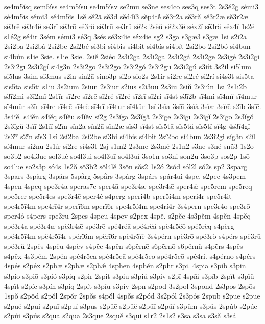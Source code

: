 {sē4m5ísq
sēm5íss
sē4m5ísu
sē4m5ísv
sē2mū
sē3ne
sēs4cō
sēs3q
sēs3t
2s3ḗ2g
sḗmi3
sḗ4m5is
sḗmĭ3
sḗ4m5ĭs
1sĕ
sĕ2ă
sĕ3d
sĕd4ĭ3
sĕp4tĕ́
sĕ3r2a
sĕ3ră
sĕ3r2æ
sĕ3r2ǣ
sĕ3rē
sĕ3r4ĕ
sĕ3rī
sĕ3rō
sĕ3rŏ
sĕ3rū
sĕ3rŭ
sĕ2s
2sĕŭ
sĕ2x3ĕ
sĕx2ĭ
sĕ́3ră
sĕ́x4ĭ
1s2é
s1é2g
sé4ir
3sém
sémi3
sé3q
3sés
sé3x4ie
séx4iē
sg2
s3ga
s3gæ3
s3gǣ
1si
s2i2a
2si2ba
2si2bá
2si2be
2si2bé
si3bi
si4bis
si4bit
si4bís
si4bít
2si2bo
2si2bó
si4bun
si4bún
s1ie
3sie.
s1iē
3siē.
2siĕ
2siéc
2s3i2ga
2s3i2gā
2s3i2gá
2s3i2gē
2s3igé
2s3i2gi
2s3i2gī
2s3i2gí
si4g3n
2s3i2go
2s3i2gō
2s3i2gó
2s3i2gu
2s3i2gú
s3iít
3s2il
si5lum
si5lus
3sim
si3mus
s2in
sin2ā
sino3p
si2o
sio2s
2s1ir
si2re
si2ré
si2rí
si4s3t
sis5ta
sis5tā
sis5ti
s1iu
3s2ium
2siun
2s3iur
s2ius
s2i3uu
2s3iū
2siŭ
2s3iún
1sī
2s1ī2b
s3ī2mi
s3ī2mĭ
2s1īr
sī2re
sī2rē
sī2rĕ
sī2ré
sī2rī
sī2rí
sī4st
s3ī́2b
sī́4mi
sī́4mĭ
sī́4mur
sī́4mŭr
s3ī́r
sī́4re
sī́4rē
sī́4rĕ
sī́4rī
sī́4tur
sī́4tŭr
1sĭ
3sĭa
3sĭā
3sĭă
3sĭæ
3sĭǣ
s2ĭb
3sĭē.
3s4ĭĕ.
s4ĭĕn
s4ĭĕq
s4ĭĕu
s4ĭĕv
sĭ2g
2s3ĭgā
2s3ĭgă
2s3ĭgē
2s3ĭgī
2s3ĭgĭ
2s3ĭgō
2s3ĭgŏ
2s3ĭgŭ
3sĭī
2s1ĭĭ
s2ĭn
sĭn2a
sĭn2ā
sĭn2æ
sĭs3
sĭ4st
sĭs5tā
sĭs5tă
sĭs5tĭ
sĭ4́g
4s3ĭ́4gĭ
2s3ĭ́ĭ
s2ĭ́n
sĭ́s3
1sí
2sí2ba
2sí2be
sí3bi
sí4bis
sí4bit
2sí2bo
sí4bun
2s3í2gi
síg3n
s2íl
sí4mur
sí2nu
2s1ír
sí2re
sí4s3t
2sj
s1m2
2s3me
2s3mé
2s1n2
s3ne
s3nĕ
snŭ́3
1s2o
so3b2
so4l3ue
sol3ué
so4l3ui
so4l3uī
so4l3uí
3so1n
so3ni
son2u
3so3p
sos2p
1sō
sō4lue
sō2s3p
sṓ4s
1s2ŏ
sŏ3b2
sŏl4lĕ
3sŏn
sŏs2
1s2ó
2sód
sól2l
só2s
sp2
3sparg
3spars
3spărg
3spărs
5spắrg
5spắrs
3spárg
3spárs
spár4ui
4spe.
s2pec
4s3pem
4spen
4speq
spe3r4a
speras7c
sper4ā
spe3r4æ
spe3r4ǣ
sper4ǽ
spe5rem
spe5req
spe5rer
spe5r4es
spe3r4ē
sper4é
s4perg
speri4b
sper5i4m
speri4r
spe5r4it
spe4r5ī4m
spe4rī4r
sperī́6m
sperī́6r
spe4r5í4m
spe4rí4r
3s4pern
spe3r4o
spe3rō
sper4ó
s4pers
spe3rū
2spes
4speu
4spev
s2pex
4spĕ.
s2pĕc
4s3pĕm
4spĕn
4spĕq
spĕ3r4a
spĕ3r4æ
spĕ3r4ǣ
spĕ3rē
spĕ4rĕā
spĕ4rĕă
spĕ4r5ĕō
spĕ5rĕq
s4pĕrg
spĕ4r5ī4m
spĕ4r5ī4r
spĕrī́6m
spĕrī́6r
spĕ4r5ĭĕ
3s4pĕrn
spĕ3rō
spĕ3rŏ
s4pĕrs
spĕ3rū
spĕ3rŭ
2spĕs
4spĕu
4spĕv
s4pĕ́c
4spĕ́n
s6pĕ́rnē
s6pĕ́rnō
s6pĕ́rnŭ
s4pĕ́rs
4spĕ́s
s4pĕ́x
4s3pém
2spén
spé4r5ea
spé4r5eā
spé4r5eo
spé4r5eō
spé4ri.
s4pérno
s4pérs
4spés
s2péx
s2phæ
s2phǣ
s2phǽ
4sphen
4sphén
s2phr
s3pi.
4spia
s3pib
s3pin
s3pio
s3piō
s3pió
s3piq
s2pir
2spit
s3piu
s3piú
s3piv
s2pī
4spĭă
s3pĭb
2spĭt
s3pĭŭ
4spĭ́t
s2píc
s3pín
s3píq
2spít
s3píu
s3pív
2spn
s2pod
3s2pol
3spond
2s3pos
2spōs
1spŏ
s2pŏd
s2pŏl
2spŏr
2spŏs
s4pŏ́l
4spŏ́s
s2pód
3s2pól
2s3pós
2spub
s2pue
s2puē
s2pué
s2pui
s2puī
s2puí
s3pus
s2pŭē
s2pŭĕ
s2pŭī
s2pŭĭ
s3pŭm
s3pŭs
2spúb
s2púe
s2púi
s3pús
s2qua
s2quā
2s3que
2squĕ
s3qui
s1r2
2s1s2
s3sa
s3sā
s3să
s3sá
}
